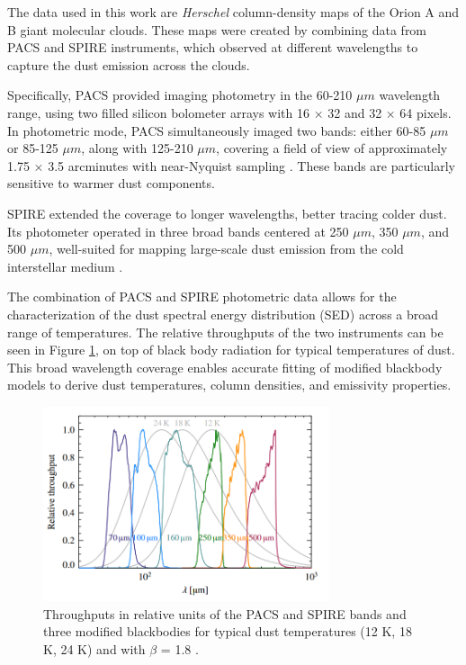 The data used in this work are \textit{Herschel} column-density maps of the Orion A and B giant molecular clouds. These maps were created by combining data from PACS and SPIRE instruments, which observed at different wavelengths to capture the dust emission across the clouds.

Specifically, PACS provided imaging photometry in the 60-210 $\mu m$ wavelength range, using two filled silicon bolometer arrays with 16 $\times$ 32 and 32 $\times$ 64 pixels. In photometric mode, PACS simultaneously imaged two bands: either 60-85 $\mu m$ or 85-125 $\mu m$, along with 125-210 $\mu m$, covering a field of view of approximately 1.75 $\times$ 3.5 arcminutes with near-Nyquist sampling \cite{poglitsch2010photodetector}. These bands are particularly sensitive to warmer dust components.

SPIRE extended the coverage to longer wavelengths, better tracing colder dust. Its photometer operated in three broad bands centered at 250 $\mu m$, 350 $\mu m$, and 500 $\mu m$, well-suited for mapping large-scale dust emission from the cold interstellar medium \cite{griffin2010herschel}. 

The combination of PACS and SPIRE photometric data allows for the characterization of the dust spectral energy distribution (SED) across a broad range of temperatures. The relative throughputs of the two instruments can be seen in Figure \ref{fig:pacs_spire_throughputs}, on top of black body radiation for typical temperatures of dust. This broad wavelength coverage enables accurate fitting of modified blackbody models to derive dust temperatures, column densities, and emissivity properties.

\begin{figure}
    \centering
    \includegraphics[width=0.75\textwidth]{figures/relative_throughputs_PACS_SPIRE.png}
    \caption{Throughputs in relative units of the PACS and SPIRE bands and three modified blackbodies for typical dust temperatures (12 K, 18 K, 24 K) and with $\beta$ = 1.8 \cite{lombardi2014herschel}.}
    \label{fig:pacs_spire_throughputs}
\end{figure}

